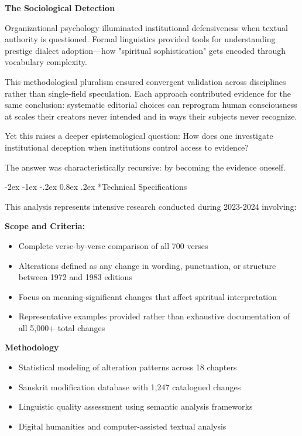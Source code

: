 \documentclass[12pt,twoside]{book}
\makeatletter
\let\oldsubsection\subsection
\renewcommand{\subsection}[1]{\needspace{3\baselineskip}\oldsubsection{#1}}
\renewcommand\subsection{\@startsection{subsection}{2}{\z@}%
{-2ex \@plus -1ex \@minus -.2ex}%
{0.8ex \@plus .2ex}%
{\normalfont\large\bfseries}}
\makeatother
\begin{document}
\vspace{0.5cm}

\textbf{\textbf{The Sociological Detection}}

Organizational psychology illuminated institutional defensiveness when textual authority is questioned. Formal linguistics provided tools for understanding prestige dialect adoption—how "spiritual sophistication" gets encoded through vocabulary complexity.

\vspace{0.5cm}

This methodological pluralism ensured convergent validation across disciplines rather than single-field speculation. Each approach contributed evidence for the same conclusion: systematic editorial choices can reprogram human consciousness at scales their creators never intended and in ways their subjects never recognize.

Yet this raises a deeper epistemological question: How does one investigate institutional deception when institutions control access to evidence?

The answer was characteristically recursive: by becoming the evidence oneself.

\vspace{0.1cm}

\subsection*{Technical Specifications}

This analysis represents intensive research conducted during 2023-2024 involving:

\textbf{\textbf{Scope and Criteria:}}
\begin{itemize}
\item Complete verse-by-verse comparison of all 700 verses
\item Alterations defined as any change in wording, punctuation, or structure between 1972 and 1983 editions
\item Focus on meaning-significant changes that affect spiritual interpretation
\item Representative examples provided rather than exhaustive documentation of all 5,000+ total changes
\end{itemize}

\textbf{\textbf{Methodology}}
\begin{itemize}
\item Statistical modeling of alteration patterns across 18 chapters
\item Sanskrit modification database with 1,247 catalogued changes
\item Linguistic quality assessment using semantic analysis frameworks
\item Digital humanities and computer-assisted textual analysis
\end{itemize}
\end{document}
